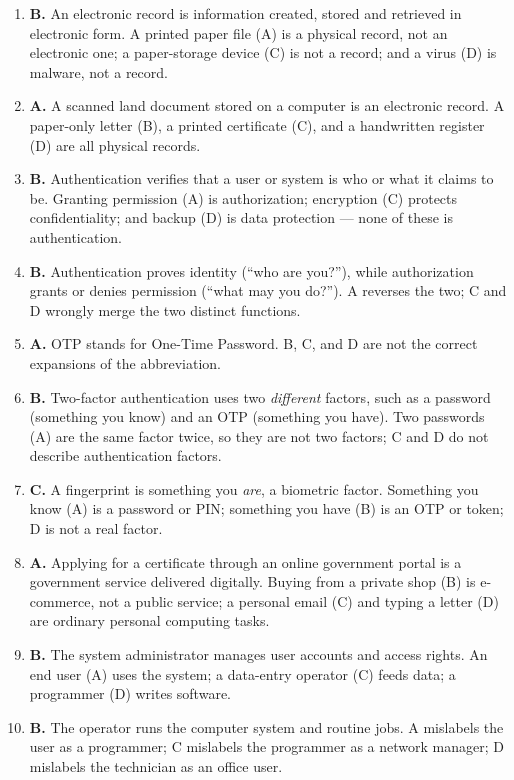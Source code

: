 \begin{enumerate}[label=\textbf{Q\arabic*.}, leftmargin=*]
  wrong because IT governance is governance \emph{of} IT, not the use of IT to
  govern the state --- that is e-governance. A omits III; B includes the false
  II; D includes the false II as well.
\item \textbf{B.} An electronic record is information created, stored and
  retrieved in electronic form. A printed paper file (A) is a physical record,
  not an electronic one; a paper-storage device (C) is not a record; and a
  virus (D) is malware, not a record.
\item \textbf{A.} A scanned land document stored on a computer is an
  electronic record. A paper-only letter (B), a printed certificate (C), and a
  handwritten register (D) are all physical records.
\item \textbf{B.} Authentication verifies that a user or system is who or what
  it claims to be. Granting permission (A) is authorization; encryption (C)
  protects confidentiality; and backup (D) is data protection --- none of
  these is authentication.
\item \textbf{B.} Authentication proves identity (``who are you?''), while
  authorization grants or denies permission (``what may you do?''). A reverses
  the two; C and D wrongly merge the two distinct functions.
\item \textbf{A.} OTP stands for One-Time Password. B, C, and D are not the
  correct expansions of the abbreviation.
\item \textbf{B.} Two-factor authentication uses two \emph{different} factors,
  such as a password (something you know) and an OTP (something you have). Two
  passwords (A) are the same factor twice, so they are not two factors; C and
  D do not describe authentication factors.
\item \textbf{C.} A fingerprint is something you \emph{are}, a biometric
  factor. Something you know (A) is a password or PIN; something you have (B)
  is an OTP or token; D is not a real factor.
\item \textbf{A.} Applying for a certificate through an online government
  portal is a government service delivered digitally. Buying from a private
  shop (B) is e-commerce, not a public service; a personal email (C) and
  typing a letter (D) are ordinary personal computing tasks.
\item \textbf{B.} The system administrator manages user accounts and access
  rights. An end user (A) uses the system; a data-entry operator (C) feeds
  data; a programmer (D) writes software.
\item \textbf{B.} The operator runs the computer system and routine jobs. A
  mislabels the user as a programmer; C mislabels the programmer as a network
  manager; D mislabels the technician as an office user.


\end{enumerate}
